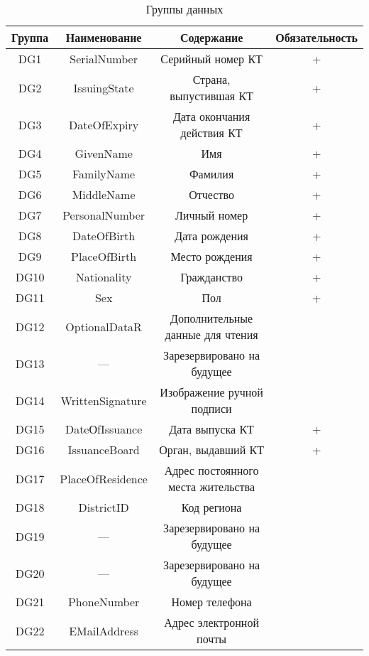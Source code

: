 \begin{table}[h!]
\caption{Группы данных}\label{Table.DATA.DG}
\begin{tabular}{|c|c|c|c|}
\hline
Группа & Наименование & Содержание & Обязательность\\
\hline
\hline
DG1 &	SerialNumber &	Серийный номер КТ  & +  \\
\hline
DG2 &	IssuingState &	Страна, выпустившая КТ & + \\
\hline
DG3 &	DateOfExpiry &	Дата окончания действия КТ & +  \\
\hline
DG4 &	GivenName   &	Имя & + \\
\hline
DG5 &	FamilyName &	Фамилия & + \\
\hline
DG6 &	MiddleName &	Отчество & + \\
\hline
DG7 &	PersonalNumber & Личный номер & + \\
\hline
DG8 &	DateOfBirth &	Дата рождения & + \\
\hline
DG9 &	PlaceOfBirth &	Место рождения & + \\
\hline
DG10 & 	Nationality &	Гражданство & +\\
\hline
DG11 &	Sex 	  &  Пол  & + \\
\hline
DG12 &	OptionalDataR & Дополнительные данные для чтения & \\
\hline
DG13 &	--- &   Зарезервировано на будущее &  \\
\hline
DG14 &  WrittenSignature & Изображение ручной подписи & \\
\hline
DG15 &  DateОfIssuance & Дата выпуска КТ  & + \\
\hline
DG16 &  IssuanceBoard & Орган, выдавший КТ  & + \\
\hline
DG17 &	PlaceOfResidence &   Адрес постоянного места жительства & \\
\hline
DG18 &	DistrictID 	 &   Код региона &  \\
\hline
DG19 &	--- &	Зарезервировано на будущее & \\
\hline
DG20 &	--- & 	Зарезервировано на будущее & \\
\hline
DG21 &	PhoneNumber & Номер телефона & \\
\hline
DG22 &	EMailAddress & Адрес электронной почты & \\
\hline
\end{tabular}
\end{table}
                         
